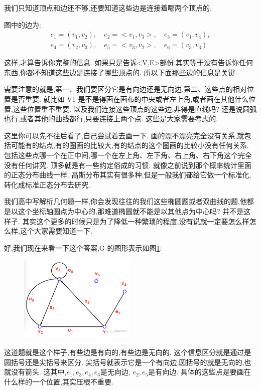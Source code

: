 我们只知道顶点和边还不够,还要知道这些边是连接着哪两个顶点的. 

图中的边为:  
\begin{align*}
  e_1=(v_1,v_2), \quad e_2=<v_1,v_3>, \quad e_3=(v_1,v_4), \\ 
  e_4=(v_2,v_3), \quad e_5=<v_3,v_2>, \quad e_6=(v_3,v_3)
\end{align*}

这样,才算告诉你完整的信息. 如果只是告诉<V,E>部份,其实等于没有告诉你任何东西,你都不知道这些边是连接了哪些顶点的. 所以下面那些边的信息是关键. 

需要注意的就是,第一、我们要区分它是有向边还是无向边,第二、这些点的相对位置是否重要. 就比如 V1 是不是得画在画布的中央或者左上角,或者画在其他什么位置,这些位置重不重要. 以及我们连接这些顶点的这些边,非得是直线吗? 还是说圆弧也行,或者其他的曲线都行,只要连接上两个点. 这些是大家需要考虑的. 

这里你可以先不往后看了,自己尝试着去画一下. 画的漂不漂亮完全没有关系,就包括可能有的结点,有的圈画的比较大,有的结点的这个圈画的比较小没有任何关系. 包括这些点哪一个在正中间,哪一个在左上角、左下角、右上角、右下角这个完全没有任何讲究. 顶多就是有一些约定俗成的习惯. 就像之前说到那个概率统计里面的正态分布曲线一样. 高斯分布其实有很多种,但是一般我们都给它做一个标准化,转化成标准正态分布去研究. 

我们高中写解析几何题一样,你会发现往往的我们这些椭圆题或者双曲线的题,他都是以这个坐标轴圆点为中心的,那难道椭圆就不能是以其他点为中心吗? 并不是这样子. 其实这个更多的时候只是为了降低一种繁琐的程度,没有说就一定要怎么样怎么样,这个大家需要知道一下. 

好,我们现在来看一下这个答案,G 的图形表示如图\ref{fig:img25_1}: 

\begin{figure}[ht]
  \centering
  \includegraphics[width=0.5\textwidth]{asset/20231227145030.png}
  \caption{}
  \label{fig:img25_1}
\end{figure}

这道题就是这个样子,有些边是有向的,有些边是无向的. 这个信息区分就是通过是圆括号还是尖括号来区分. 尖括号就表示它是一个有向边,圆括号的就是无向的,也就没有箭头. 这其中,$e_1, e_3, e_4, e_6$是无向边, $e_2, e_5$是有向边. 具体的这些点是要画在什么样的一个位置,其实压根不重要. 

